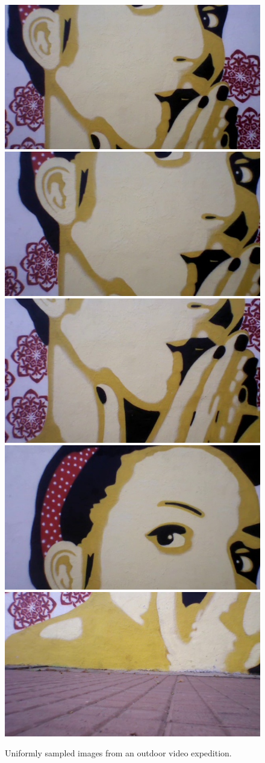 \begin{figure}[htb!]
\centering
\includegraphics[width=0.19\linewidth]{figures/sac3/uniform_sampled/1.jpg}
\includegraphics[width=0.19\linewidth]{figures/sac3/uniform_sampled/5.jpg}
\includegraphics[width=0.19\linewidth]{figures/sac3/uniform_sampled/4.jpg}
\includegraphics[width=0.19\linewidth]{figures/sac3/uniform_sampled/2.jpg}
\includegraphics[width=0.19\linewidth]{figures/sac3/uniform_sampled/3.jpg}
\caption{Uniformly sampled images from an outdoor video expedition.}
\label{fig:uniformsampled_sac3}
\end{figure}

